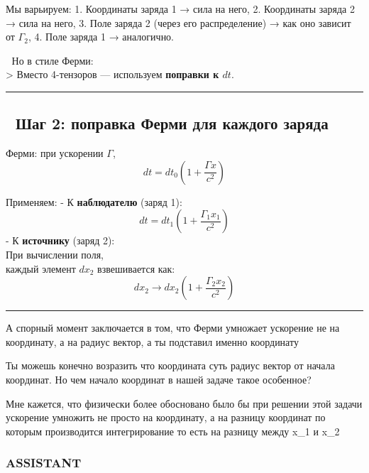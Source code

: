 \documentclass[11pt]{article}
\begin{document}
Мы варьируем: 1. Координаты заряда 1 → сила на него, 2. Координаты
заряда 2 → сила на него, 3. Поле заряда 2 (через его распределение) →
как оно зависит от \(\Gamma_2\), 4. Поле заряда 1 → аналогично.

📌 Но в стиле Ферми:\\
\textgreater{} Вместо 4-тензоров --- используем \textbf{поправки к
\(dt\)}.

\begin{center}\rule{0.5\linewidth}{\linethickness}\end{center}

\subsection{🔹 Шаг 2: поправка Ферми для каждого
заряда}\label{ux448ux430ux433-2-ux43fux43eux43fux440ux430ux432ux43aux430-ux444ux435ux440ux43cux438-ux434ux43bux44f-ux43aux430ux436ux434ux43eux433ux43e-ux437ux430ux440ux44fux434ux430}

Ферми: при ускорении \(\Gamma\),\\
\[
dt = dt_0 \left( 1 + \frac{\Gamma x}{c^2} \right)
\]

Применяем: - К \textbf{наблюдателю} (заряд 1):\\
\[
  dt = dt_1 \left( 1 + \frac{\Gamma_1 x_1}{c^2} \right)
  \] - К \textbf{источнику} (заряд 2):\\
При вычислении поля,\\
каждый элемент \(dx_2\) взвешивается как:\\
\[
  dx_2 \to dx_2 \left( 1 + \frac{\Gamma_2 x_2}{c^2} \right)
  \]

\begin{center}\rule{0.5\linewidth}{\linethickness}\end{center}

А спорный момент заключается в том, что Ферми умножает ускорение не на
координату, а на радиус вектор, а ты подставил именно координату

Ты можешь конечно возразить что координата суть радиус вектор от начала
координат. Но чем начало координат в нашей задаче такое особенное?

Мне кажется, что физически более обосновано было бы при решении этой
задачи ускорение умножить не просто на координату, а на разницу
координат по которым производится интегрирование то есть на разницу
между x\_1 и x\_2

\subsubsection{ASSISTANT}\label{assistant}
\end{document}
